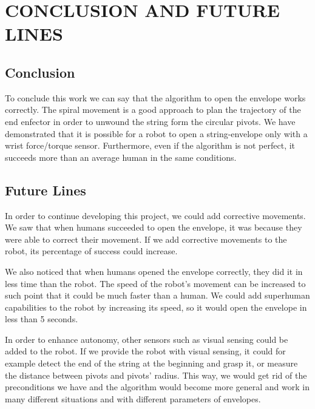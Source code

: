\chapter{CONCLUSION AND FUTURE LINES}
\label{ch:Conclusion and Future Lines}

\section{Conclusion}
To conclude this work we can say that the algorithm to open the envelope works correctly. The spiral movement is a good approach to plan the trajectory of the end enfector in order to unwound the string form the circular pivots. We have demonstrated that it is possible for a robot to open a string-envelope only with a wrist force/torque sensor. Furthermore, even if the algorithm is not perfect, it succeeds more than an average human in the same conditions.

\section{Future Lines}
In order to continue developing this project, we could add corrective movements. We saw that when humans succeeded to open the envelope, it was because they were able to correct their movement. If we add corrective movements to the robot, its percentage of success could increase.

We also noticed that when humans opened the envelope correctly, they did it in less time than the robot. The speed of the robot's movement can be increased to such point that it could be much faster than a human. We could add superhuman capabilities to the robot by increasing its speed, so it would open the envelope in less than 5 seconds.

In order to enhance autonomy, other sensors such as visual sensing could be added to the robot. If we provide the robot with visual sensing, it could for example detect the end of the string at the beginning and grasp it, or measure the distance between pivots and pivots' radius. This way, we would get rid of the preconditions we have and the algorithm would become more general and work in many different situations and with different parameters of envelopes.

